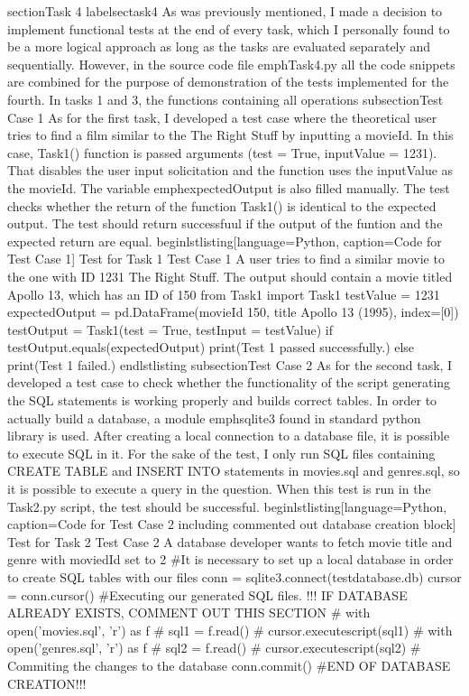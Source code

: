 section{Task 4}
label{sectask4}
As was previously mentioned, I made a decision to implement functional tests at the end of every  task,
which I personally found to be a more logical approach as long as the tasks are evaluated separately and sequentially.
However, in the source code file emph{Task4.py} all the code snippets are combined for the purpose of  demonstration of the tests implemented for the fourth. In tasks 1 and 3, the functions containing all 
operations 
subsection{Test  Case 1}
As for the first  task, I developed a test case where the theoretical user tries to find a film
similar to the The Right Stuff by inputting a movieId. In this case, Task1() function is passed
arguments (test = True, inputValue = 1231). That disables the user input solicitation and the function uses the inputValue as the movieId.
The variable  emph{expectedOutput} is also filled manually. The test checks whether the return of the function Task1() is identical to the expected output. The test should return successfuul if the output 
of the funtion and the expected return are equal.
begin{lstlisting}[language=Python, caption=Code for Test Case 1]
 Test for Task 1 
Test Case 1 A user tries to find a similar movie to the one with ID 1231 The Right Stuff. The output should contain a movie titled Apollo 13, which has an ID of 150
from Task1 import Task1
testValue = 1231
expectedOutput = pd.DataFrame({movieId 150, title Apollo 13 (1995)}, index=[0])
testOutput =  Task1(test = True, testInput = testValue)
if testOutput.equals(expectedOutput)
        print(Test 1 passed successfully.)
else
        print(Test 1 failed.)
end{lstlisting}
subsection{Test Case 2}
As for the second  task, I developed a test case to check whether the functionality of the script generating the SQL statements is working properly and builds correct tables.
In order to actually build a database, a module emph{sqlite3} found in standard python library is used.
After creating a local  connection to a database file, it is possible to execute SQL in it. For the sake
of the test, I only run SQL files containing CREATE TABLE and INSERT  INTO statements in movies.sql and genres.sql, so it is possible to execute a query in the  question.
When this test is run in the Task2.py script, the test should be successful.
begin{lstlisting}[language=Python, caption=Code for Test Case 2 including  commented out database creation block]
 Test for Task 2 
Test Case 2 A database developer wants to fetch movie title and genre with moviedId set to 2  
#It is necessary to  set up a local database in order to create SQL tables with our files
conn = sqlite3.connect(testdatabase.db)
cursor = conn.cursor()
#Executing our generated SQL files. !!! IF DATABASE ALREADY EXISTS, COMMENT OUT THIS SECTION
# with open('movies.sql', 'r') as f
#         sql1 = f.read()
#         cursor.executescript(sql1)
# with open('genres.sql', 'r') as f
#         sql2 = f.read()
#         cursor.executescript(sql2)
# Commiting the changes to the database
conn.commit()
#END OF DATABASE CREATION!!!

